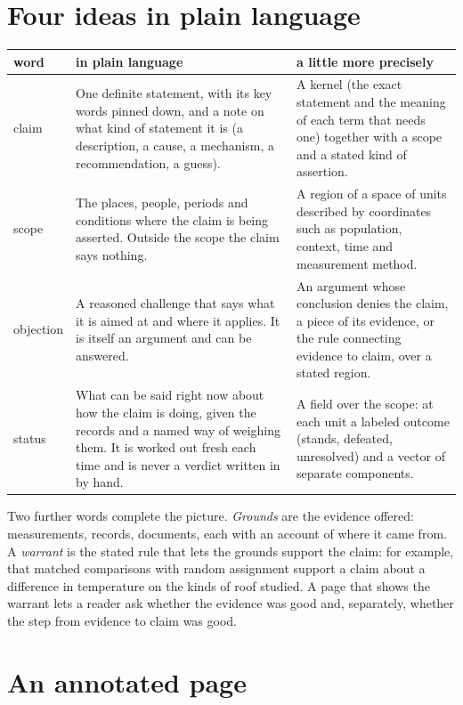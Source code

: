 \documentclass[11pt]{article}
\begin{document}
\section{Four ideas in plain language}\label{sec:words}

\begin{center}
\small
\begin{tabularx}{\textwidth}{@{}l X X@{}}
\toprule
word & in plain language & a little more precisely\\
\midrule
claim & One definite statement, with its key words pinned down, and a note on what kind of statement it is (a description, a cause, a mechanism, a recommendation, a guess). & A kernel (the exact statement and the meaning of each term that needs one) together with a scope and a stated kind of assertion.\\
scope & The places, people, periods and conditions where the claim is being asserted. Outside the scope the claim says nothing. & A region of a space of units described by coordinates such as population, context, time and measurement method.\\
objection & A reasoned challenge that says what it is aimed at and where it applies. It is itself an argument and can be answered. & An argument whose conclusion denies the claim, a piece of its evidence, or the rule connecting evidence to claim, over a stated region.\\
status & What can be said right now about how the claim is doing, given the records and a named way of weighing them. It is worked out fresh each time and is never a verdict written in by hand. & A field over the scope: at each unit a labeled outcome (stands, defeated, unresolved) and a vector of separate components.\\
\bottomrule
\end{tabularx}
\end{center}

Two further words complete the picture. \emph{Grounds} are the evidence offered: measurements, records, documents, each with an account of where it came from. A \emph{warrant} is the stated rule that lets the grounds support the claim: for example, that matched comparisons with random assignment support a claim about a difference in temperature on the kinds of roof studied. A page that shows the warrant lets a reader ask whether the evidence was good and, separately, whether the step from evidence to claim was good.

\section{An annotated page}\label{sec:page}
\end{document}
